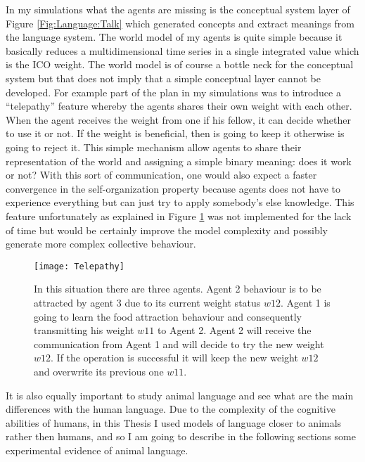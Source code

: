 In my simulations what the agents are missing is the conceptual system layer
of Figure \ref{Fig:Language:Talk} which generated concepts and extract meanings
from the language system.
The world model of my agents is quite simple because it basically reduces a multidimensional
time series in a single integrated value which is the ICO weight.
The world model is of course a bottle neck for the conceptual system but that
does not imply that a simple conceptual layer cannot be developed.
For example part of the plan in my simulations was to introduce a ``telepathy'' feature
whereby the agents shares their own weight with each other.
When the agent receives the weight from one if his fellow, it can decide whether
to use it or not.
If the weight is beneficial, then is going to keep it otherwise is going to reject it.
This simple mechanism allow agents to share their representation of the world
and assigning a simple binary meaning: does it work or not?
With this sort of communication, one would also expect a faster convergence in the
self-organization property because agents does not have to experience everything
but can just try to apply somebody's else knowledge.
This feature unfortunately as explained in Figure \ref{Fig:Language:Telepahty}
was not implemented for the lack of time but would be
certainly improve the model complexity and possibly generate more complex collective
behaviour. 

\begin{figure}[htbp]
\begin{center}
\texttt{[image: Telepathy]}
\end{center}
\small{
\caption[More advanced language model]{
In this situation there are three agents.
Agent 2 behaviour is to be attracted by agent 3 due to its current weight status $w12$.
Agent 1 is going to learn the food attraction behaviour and consequently
transmitting his weight $w11$ to Agent 2.
Agent 2 will receive the communication from Agent 1 and will decide to try
the new weight $w12$.
If the operation is successful it will keep the new weight $w12$ and overwrite
its previous one $w11$.
\label{Fig:Language:Telepahty}}}
\end{figure}


It is also equally important to study animal language and see what are the
main differences with the human language.
Due to the complexity of the cognitive abilities of humans, in this Thesis
I used models of language closer to animals rather then
humans, and so I am going to describe in the following sections some experimental
evidence of animal language.

